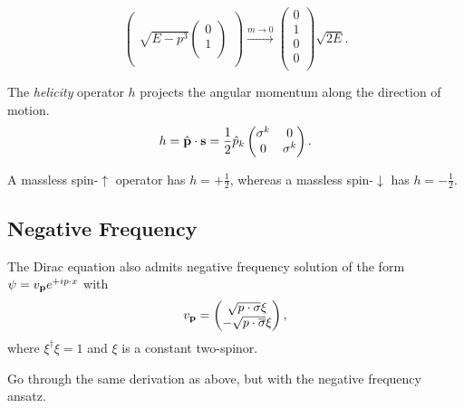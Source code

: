 \begin{example}[$\vb{p} = 0$]
\begin{equation}
\begin{pmatrix}
    \\
    \sqrt{E - p^3}
    \begin{pmatrix}
    0 \\
    1 \\
    \end{pmatrix}
    \\
    \end{pmatrix}
    \xrightarrow{m \to 0}
    \begin{pmatrix}
    0 \\
    1 \\
    0 \\
    0 \\
    \end{pmatrix} \sqrt{2 E}.
    \label{eq:16-m2}
  \end{equation}
\end{example}

\begin{definition}[helicity]
  The \emph{helicity} operator $h$ projects the angular momentum along the direction of motion.
  \begin{equation}
    h = \hat{\vb{p}} \cdot \vb{s} = \frac{1}{2} \hat p_{k}
    \begin{pmatrix}
     \sigma^{k} & 0 \\
     0 & \sigma^{k} \\
    \end{pmatrix}.
  \end{equation}
\end{definition}
A massless spin-$\uparrow$ operator has $h = + \frac{1}{2}$, whereas a massless spin-$\downarrow$ has $h = -\frac{1}{2}$.

\subsection*{Negative Frequency}%

The Dirac equation also admits negative frequency solution of the form $\psi = v_{\vb{p}} e^{+i p \cdot x}$ with
\begin{equation}
  v_{\vb{p}} = 
  \begin{pmatrix}
  \sqrt{p \cdot \sigma} \xi \\
  - \sqrt{p \cdot \overline{\sigma}} \xi \\
  \end{pmatrix},
\end{equation}
where $\xi^{\dagger} \xi = 1$ and $\xi$ is a constant two-spinor.
\begin{exercise}
  Go through the same derivation as above, but with the negative frequency ansatz.
\end{exercise}

